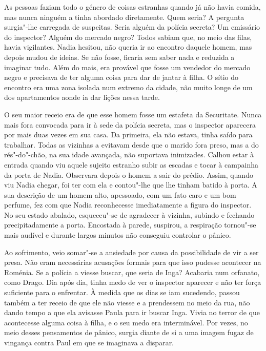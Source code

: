 As pessoas faziam todo o género de coisas estranhas quando já não havia
comida, mas nunca ninguém a tinha abordado diretamente. Quem seria? A
pergunta surgia"-lhe carregada de suspeitas. Seria alguém da polícia secreta? Um
emissário do inspector? Alguém do mercado
negro? Todos sabiam que, no meio das filas, havia vigilantes. Nadia
hesitou, não queria ir ao encontro daquele homem, mas depois mudou de
ideias. Se não fosse, ficaria sem saber nada e reduzida a imaginar tudo.
Além do mais, era provável que fosse um vendedor do mercado negro e
precisava de ter alguma coisa para dar de jantar à filha. O sítio do
encontro era uma zona isolada num extremo da cidade, não muito longe de
um dos apartamentos aonde ia dar lições nessa tarde.

O seu maior receio era de que esse homem fosse um estafeta da
Securitate. Nunca mais fora convocada para ir à sede da polícia secreta,
mas o inspector aparecera por mais duas vezes em sua casa. Da primeira,
ela não estava, tinha saído para trabalhar. Todas as vizinhas a evitavam
desde que o marido fora preso, mas a do rés"-do"-chão, na sua idade
avançada, não suportava inimizades. Calhou estar à entrada quando viu
aquele sujeito estranho subir as escadas e tocar à campainha da porta de
Nadia. Observara depois o homem a sair do prédio. Assim, quando viu
Nadia chegar, foi ter com ela e contou"-lhe que lhe tinham batido à
porta. A sua descrição de um homem alto, apessoado, com um fato caro e
um bom perfume, fez com que Nadia reconhecesse imediatamente a figura do
inspector. No seu estado abalado, esqueceu"-se de agradecer à vizinha,
subindo e fechando precipitadamente a porta. Encostada à parede,
suspirou, a respiração tornou"-se mais audível e durante largos minutos
não conseguiu controlar o pânico.

Ao sofrimento, veio somar"-se a
ansiedade por causa da possibilidade de vir a ser presa. Não eram
necessárias acusações formais para que isso pudesse acontecer na
Roménia. Se a polícia a viesse buscar, que seria de Inga? Acabaria num
orfanato, como Drago. Dia após dia, tinha medo de ver o inspector
aparecer e não ter força suficiente para o enfrentar. À medida que os
dias se iam sucedendo, passou também a ter receio de que ele não viesse
e a prendessem no meio da rua, não dando tempo a que ela avisasse
Paula para ir buscar Inga. Vivia no terror de que acontecesse alguma
coisa à filha, e o seu medo era interminável. Por vezes, no meio
desses pensamentos de pânico, surgia diante de si a uma imagem fugaz de
vingança contra Paul em que se imaginava a disparar.


